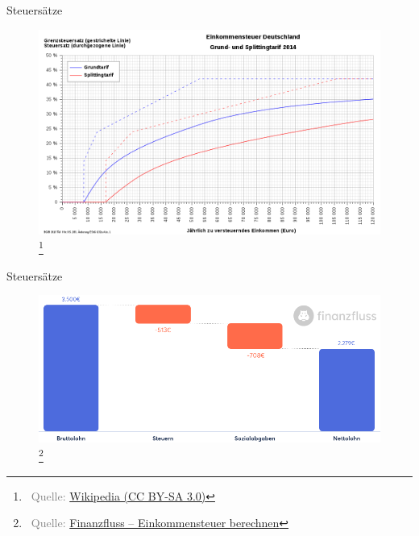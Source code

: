 \documentclass[draft]{beamer}
\let\oldfootnote\footnote
\renewcommand{\footnote}[1]
{%
	\oldfootnote
	{
		\tiny
		\textcolor{gray}{\ #1}
	}%
}
\newcommand{\citeurl}[2]
{%
	\footnote{Quelle: \href{#1}{#2}}
}
\begin{document}
			\begin{frame}{Steuersätze}
				\begin{center}
					\vspace{-0.5cm}
					\begin{figure}
						\includegraphics[width=0.9\linewidth]{images/tarifzonen-diagramm}\citeurl{https://commons.wikimedia.org/wiki/File:ESt_D_Tarif_2014_Splitting_120kEUR.svg}{Wikipedia (CC BY-SA 3.0)}
					\end{figure}
				\end{center}
			\end{frame}
		
			\begin{frame}{Steuersätze}
				\begin{center}
					\vspace{-0.5cm}
					\begin{figure}
						\includegraphics[width=0.8\linewidth]{images/steuerrechner}\citeurl{https://www.finanzfluss.de/rechner/einkommensteuer/}{Finanzfluss -- Einkommensteuer berechnen}
					\end{figure}
				\end{center}
			\end{frame}
			
\end{document}
